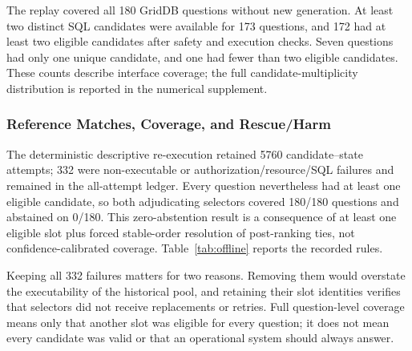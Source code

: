 \documentclass[information,article,submit,moreauthors]{Definitions/mdpi}
\begin{document}
The replay covered all 180 GridDB questions without new generation. At least two distinct SQL candidates were available for 173 questions, and 172 had at least two eligible candidates after safety and execution checks. Seven questions had only one unique candidate, and one had fewer than two eligible candidates. These counts describe interface coverage; the full candidate-multiplicity distribution is reported in the numerical supplement.

\subsubsection{Reference Matches, Coverage, and Rescue/Harm}

The deterministic descriptive re-execution retained 5760 candidate--state attempts; 332 were non-executable or authorization/resource/SQL failures and remained in the all-attempt ledger. Every question nevertheless had at least one eligible candidate, so both adjudicating selectors covered 180/180 questions and abstained on 0/180. This zero-abstention result is a consequence of at least one eligible slot plus forced stable-order resolution of post-ranking ties, not confidence-calibrated coverage. Table~\ref{tab:offline} reports the recorded rules.

Keeping all 332 failures matters for two reasons. Removing them would overstate the executability of the historical pool, and retaining their slot identities verifies that selectors did not receive replacements or retries. Full question-level coverage means only that another slot was eligible for every question; it does not mean every candidate was valid or that an operational system should always answer.
\end{document}
